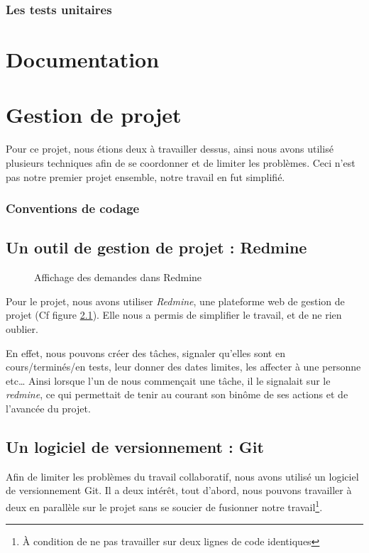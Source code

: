 \documentclass[12pt,a4paper,openany]{book}
\begin{document}
		\subsection{Les tests unitaires}
	\chapter{Documentation}
	\chapter{Gestion de projet}
	Pour ce projet, nous étions deux à travailler dessus, ainsi nous avons utilisé plusieurs techniques afin de se coordonner et de limiter les problèmes. Ceci
	n'est pas notre premier projet ensemble, notre travail en fut simplifié.
	\subsection{Conventions de codage}
	\section{Un outil de gestion de projet : Redmine}
	\begin{figure}[H]
		\centering
		\caption{Affichage des demandes dans Redmine}
		\label{fig:redmine}
	\end{figure}
	Pour le projet, nous avons utiliser \textit{Redmine}, une plateforme web de gestion de projet (Cf figure \ref{fig:redmine}). Elle nous a permis de simplifier le travail, et
	de ne rien oublier.

	En effet, nous pouvons créer des tâches, signaler qu'elles sont en cours/terminés/en tests, leur donner des dates limites, les affecter à une personne etc\ldots
	Ainsi lorsque l'un de nous commençait une tâche, il le signalait sur le \textit{redmine}, ce qui permettait de tenir au courant son binôme de ses actions et
	de l'avancée du projet.

	\section{Un logiciel de versionnement : Git}
	Afin de limiter les problèmes du travail collaboratif, nous avons utilisé un logiciel de versionnement Git. Il a deux intérêt, tout d'abord, nous pouvons
	travailler à deux en parallèle sur le projet sans se soucier de fusionner notre travail\footnote{À condition de ne pas travailler sur deux lignes de code
	identiques}.
\end{document}
